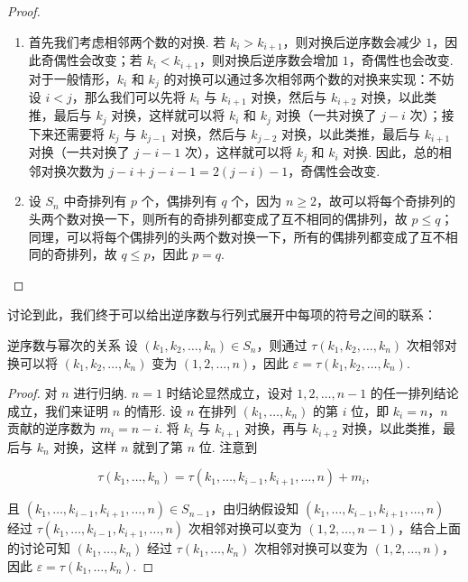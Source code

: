 \begin{proof}
    \begin{enumerate}
        \item 首先我们考虑相邻两个数的对换. 若 $k_i > k_{i+1}$，则对换后逆序数会减少 $1$，因此奇偶性会改变；若 $k_i < k_{i+1}$，则对换后逆序数会增加 $1$，奇偶性也会改变. 对于一般情形，$k_i$ 和 $k_j$ 的对换可以通过多次相邻两个数的对换来实现：不妨设 $i < j$，那么我们可以先将 $k_i$ 与 $k_{i+1}$ 对换，然后与 $k_{i+2}$ 对换，以此类推，最后与 $k_j$ 对换，这样就可以将 $k_i$ 和 $k_j$ 对换（一共对换了 $j-i$ 次）；接下来还需要将 $k_j$ 与 $k_{j-1}$ 对换，然后与 $k_{j-2}$ 对换，以此类推，最后与 $k_{i+1}$ 对换（一共对换了 $j-i-1$ 次），这样就可以将 $k_j$ 和 $k_i$ 对换. 因此，总的相邻对换次数为 $j-i+j-i-1=2(j-i)-1$，奇偶性会改变.
        \item 设 $S_n$ 中奇排列有 $p$ 个，偶排列有 $q$ 个，因为 $n \geqslant 2$，故可以将每个奇排列的头两个数对换一下，则所有的奇排列都变成了互不相同的偶排列，故 $p \leqslant q$；同理，可以将每个偶排列的头两个数对换一下，所有的偶排列都变成了互不相同的奇排列，故 $q \leqslant p$，因此 $p = q$.
    \end{enumerate}
\end{proof}

讨论到此，我们终于可以给出逆序数与行列式展开中每项的符号之间的联系：

\begin{lemma}{}{逆序数与幂次的关系}
    设 $(k_1,k_2,\ldots,k_n) \in S_n$，则通过 $\tau(k_1,k_2,\ldots,k_n)$ 次相邻对换可以将 $(k_1,k_2,\ldots,k_n)$ 变为 $(1,2,\ldots,n)$，因此 $\varepsilon = \tau(k_1,k_2,\ldots,k_n)$.
\end{lemma}

\begin{proof}
    对 $n$ 进行归纳. $n=1$ 时结论显然成立，设对 $1,2,\ldots,n-1$ 的任一排列结论成立，我们来证明 $n$ 的情形. 设 $n$ 在排列 $(k_1,\ldots,k_n)$ 的第 $i$ 位，即 $k_i = n$，$n$ 贡献的逆序数为 $m_i = n - i$. 将 $k_i$ 与 $k_{i+1}$ 对换，再与 $k_{i+2}$ 对换，以此类推，最后与 $k_n$ 对换，这样 $n$ 就到了第 $n$ 位. 注意到

    \[ \tau(k_1,\ldots,k_n) = \tau(k_1,\ldots,k_{i-1},k_{i+1},\ldots,n) + m_i,\]

    且 $(k_1,\ldots,k_{i-1},k_{i+1},\ldots,n) \in S_{n-1}$，由归纳假设知 $(k_1,\ldots,k_{i-1},k_{i+1},\ldots,n)$ 经过 $\tau(k_1,\ldots,k_{i-1},k_{i+1},\ldots,n)$ 次相邻对换可以变为 $(1,2,\ldots,n-1)$，结合上面的讨论可知 $(k_1,\ldots,k_n)$ 经过 $\tau(k_1,\ldots,k_n)$ 次相邻对换可以变为 $(1,2,\ldots,n)$，因此 $\varepsilon = \tau(k_1,\ldots,k_n)$.
\end{proof}


